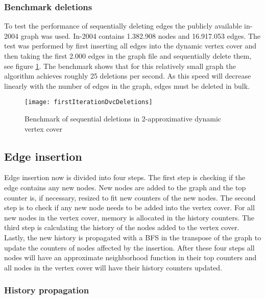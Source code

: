 \subsubsection{Benchmark deletions}
To test the performance of sequentially deleting edges the publicly available in-2004 graph was used. In-2004 contains 1.382.908 nodes and 16.917.053 edges. The test was performed by first inserting all edges into the dynamic vertex cover and then taking the first 2.000 edges in the graph file and sequentially delete them, see figure \ref{fig:firstIterationDvcDeletion}. The benchmark shows that for this relatively small graph the algorithm achieves roughly 25 deletions per second. As this speed will decrease linearly with the number of edges in the graph, edges must be deleted in bulk.


\begin{figure}[h]
\centering
\texttt{[image: firstIterationDvcDeletions]}    
\captionsetup{justification=centering}
\caption {Benchmark of sequential deletions in 2-approximative dynamic vertex cover}
\label{fig:firstIterationDvcDeletion}
\end{figure}

\subsection{Edge insertion}

Edge insertion now is divided into four steps. The first step is checking if the edge contains any new nodes. New nodes are added to the graph and the top counter is, if necessary, resized to fit new counters of the new nodes. The second step is to check if any new node needs to be added into the vertex cover. For all new nodes in the vertex cover, memory is allocated in the history counters. The third step is calculating the history of the nodes added to the vertex cover. Lastly, the new history is propagated with a BFS in the transpose of the graph to update the counters of nodes affected by the insertion. After these four steps all nodes will have an approximate neighborhood function in their top counters and all nodes in the vertex cover will have their history counters updated. 

\subsubsection{History propagation}

